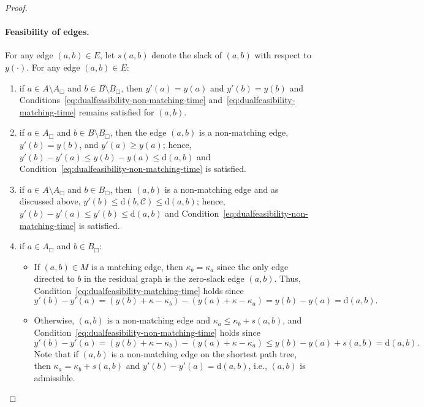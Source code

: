 \documentclass[11pt,onecolumn]{article}
\def\mcC{{\mathcal{C}}}
\newcommand{\cell}{\Box}
\newcommand{\distance}[2]{\mathrm{d}(#1, #2)}
\newcommand\myparagraph[1]{\paragraph{#1}}
\begin{document}
\begin{proof}
\begin{enumerate}
    \end{enumerate}

    \myparagraph{Feasibility of edges.} For any edge $(a,b)\in E$, let $s(a,b)$ denote the slack of $(a,b)$ with respect to $y(\cdot)$. For any edge $(a,b)\in E$:
    \begin{enumerate}
        \item if $a\in A\setminus A_\cell$ and $b\in B\setminus B_\cell$, then $y'(a)=y(a)$ and $y'(b)=y(b)$ and Conditions~\eqref{eq:dualfeasibility-non-matching-time} and~\eqref{eq:dualfeasibility-matching-time} remains satisfied for $(a,b)$.
        
        \item if $a\in A_\cell$ and $b\in B\setminus B_\cell$, then the edge $(a,b)$ is a non-matching edge, $y'(b)=y(b)$, and $y'(a)\ge y(a)$; hence, $y'(b)-y'(a)\le y(b)-y(a)\le \distance{a}{b}$ and Condition~\eqref{eq:dualfeasibility-non-matching-time} is satisfied.

        \item if $a\in A\setminus A_\cell$ and $b\in B_\cell$, then $(a,b)$ is a non-matching edge and as discussed above, $y'(b)\le \distance{b}{\mcC}\le \distance{a}{b}$; hence, $y'(b)-y'(a)\le y'(b)\le \distance{a}{b}$ and Condition~\eqref{eq:dualfeasibility-non-matching-time} is satisfied.

        \item if $a\in A_\cell$ and $b\in B_\cell$: 
        \begin{itemize}
            \item If $(a,b)\in M$ is a matching edge, then $\kappa_b = \kappa_a$ since the only edge directed to $b$ in the residual graph is the zero-slack edge $(a,b)$. Thus, Condition~\eqref{eq:dualfeasibility-matching-time} holds since
            \begin{equation*}
            y'(b) - y'(a) = (y(b)+\kappa-\kappa_b) - (y(a)+\kappa-\kappa_a) = y(b)-y(a) = \distance{a}{b}.
            \end{equation*}
            \item Otherwise, $(a,b)$ is a non-matching edge and $\kappa_a\le \kappa_b + s(a,b)$, and Condition~\eqref{eq:dualfeasibility-non-matching-time} holds since
            \begin{equation*}
                y'(b)-y'(a) = (y(b)+\kappa-\kappa_b) - (y(a)+\kappa-\kappa_a) \le y(b)-y(a) + s(a, b) = \distance{a}{b}.
            \end{equation*}
            Note that if $(a,b)$ is a non-matching edge on the shortest path tree, then $\kappa_a= \kappa_b + s(a,b)$ and $y'(b)-y'(a) = \distance{a}{b}$, i.e., $(a,b)$ is admissible.
        \end{itemize}
    \end{enumerate}


\end{proof}
\end{document}
